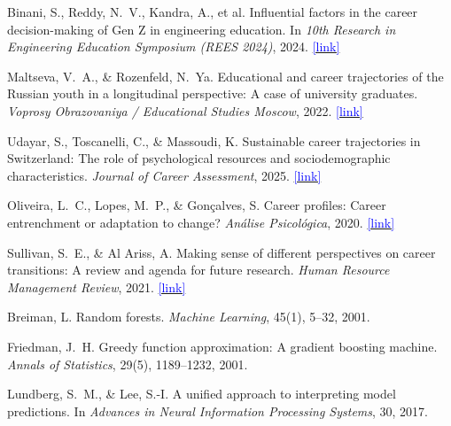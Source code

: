 \documentclass[10pt,twocolumn]{article}
\newcommand{\surl}[1]{\href{#1}{\textcolor{blue}{\small[link]}}}
\begin{document}
\begin{thebibliography}{25}
Binani, S., Reddy, N.\ V., Kandra, A., et al.
\newblock Influential factors in the career decision-making of Gen Z in
engineering education.
\newblock In \emph{10th Research in Engineering Education Symposium
(REES 2024)}, 2024.
\newblock \surl{https://www.scopus.com/pages/publications/85195777820}

Maltseva, V.\ A., \& Rozenfeld, N.\ Ya.
\newblock Educational and career trajectories of the Russian youth in a
longitudinal perspective: A case of university graduates.
\newblock \emph{Voprosy Obrazovaniya / Educational Studies Moscow}, 2022.
\newblock \surl{https://www.scopus.com/pages/publications/85141267140}

Udayar, S., Toscanelli, C., \& Massoudi, K.
\newblock Sustainable career trajectories in Switzerland: The role of
psychological resources and sociodemographic characteristics.
\newblock \emph{Journal of Career Assessment}, 2025.
\newblock \surl{https://www.scopus.com/pages/publications/85187111078}

Oliveira, L.\ C., Lopes, M.\ P., \& Gonçalves, S.
\newblock Career profiles: Career entrenchment or adaptation to change?
\newblock \emph{Análise Psicológica}, 2020.
\newblock \surl{https://www.scopus.com/pages/publications/85099287425}

Sullivan, S.\ E., \& Al Ariss, A.
\newblock Making sense of different perspectives on career transitions: A review
and agenda for future research.
\newblock \emph{Human Resource Management Review}, 2021.
\newblock \surl{https://www.scopus.com/pages/publications/85072163882}

Breiman, L.
\newblock Random forests.
\newblock \emph{Machine Learning}, 45(1), 5--32, 2001.

Friedman, J.\ H.
\newblock Greedy function approximation: A gradient boosting machine.
\newblock \emph{Annals of Statistics}, 29(5), 1189--1232, 2001.

Lundberg, S.\ M., \& Lee, S.-I.
\newblock A unified approach to interpreting model predictions.
\newblock In \emph{Advances in Neural Information Processing Systems}, 30,
2017.

\end{thebibliography}
\end{document}
